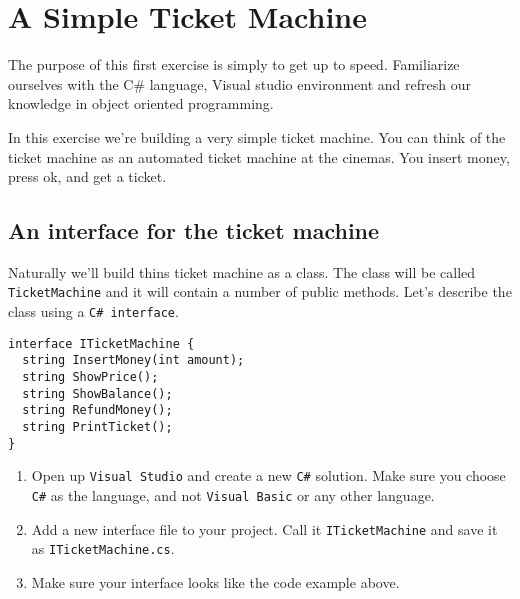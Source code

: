 \documentclass{article}
\newcounter{stepcounter}
\newenvironment{steps}{ 
  \begin{enumerate}[label=\color{red}Step \theenumi)]
    \setcounter{enumi}{\value{stepcounter}}
}{
  \setcounter{stepcounter}{\value{enumi}}
  \end{enumerate}
}
\begin{document}
\pagebreak
\section{ A Simple Ticket Machine }
The purpose of this first exercise is simply to get up to speed. Familiarize ourselves with the C\# language, Visual studio environment and refresh our knowledge in object oriented programming.

In this exercise we’re building a very simple ticket machine. You can think of the ticket machine as an automated ticket machine at the cinemas. You insert money, press ok, and get a ticket.


\subsection{An interface for the ticket machine}
Naturally we'll build thins ticket machine as a class. The class will be called \texttt{TicketMachine} and it will contain a number of public methods. Let's describe the class using a \texttt{C\# interface}.

\begin{lstlisting}
interface ITicketMachine {
  string InsertMoney(int amount);
  string ShowPrice();
  string ShowBalance();
  string RefundMoney();
  string PrintTicket();
}
\end{lstlisting}
\begin{steps}
\item Open up \texttt{Visual Studio} and create a new \texttt{C\#} solution. Make sure you choose \texttt{C\#} as the language, and not \texttt{Visual Basic} or any other language.
\item Add a new interface file to your project. Call it \texttt{ITicketMachine} and save it as \texttt{ITicketMachine.cs}.
\item Make sure your interface looks like the code example above.
\end{steps}
\end{document}
